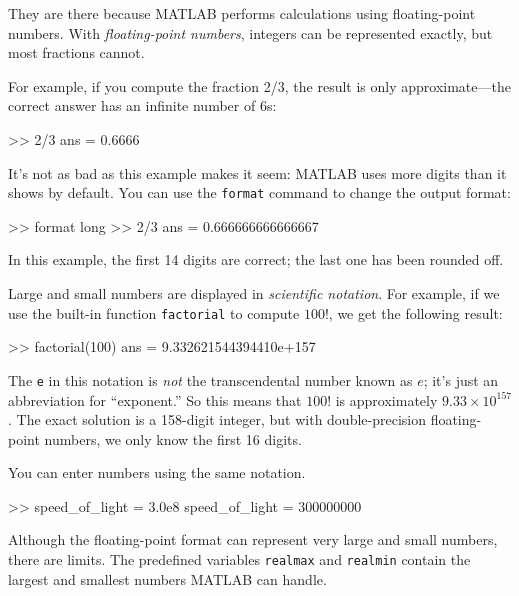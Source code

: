 They are there because MATLAB performs calculations using floating-point numbers.  With \emph{floating-point numbers}, integers can be represented exactly, but most fractions cannot.


For example, if you compute the fraction 2/3, the result is only approximate---the correct answer has an infinite number of 6s:

\begin{code}
>> 2/3
ans = 0.6666
\end{code}



It's not as bad as this example makes it seem: MATLAB uses more digits than it shows by default.
You can use the \lstinline{format} command to change the output format:


\begin{code}
>> format long
>> 2/3
ans = 0.666666666666667
\end{code}

In this example, the first 14 digits are correct; the last one has been rounded off.


Large and small numbers are displayed in \emph{scientific notation}.
For example, if we use the built-in function \lstinline{factorial} to compute $100!$, we get the following result:

\begin{code}
>> factorial(100)
ans = 9.332621544394410e+157
\end{code}

The \lstinline{e} in this notation is \emph{not} the transcendental number
known as $e$; it's just an abbreviation for ``exponent.''  So
this means that $100!$ is approximately $9.33 \times 10^{157}$.  The
exact solution is a 158-digit integer, but with double-precision floating-point numbers, we only know the first 16 digits.


You can enter numbers using the same notation.

\begin{code}
>> speed_of_light = 3.0e8
speed_of_light = 300000000
\end{code}

Although the floating-point format can represent very large and small numbers,
there are limits.
The predefined variables \lstinline{realmax} and \lstinline{realmin}
contain the largest and smallest numbers MATLAB
can handle.

